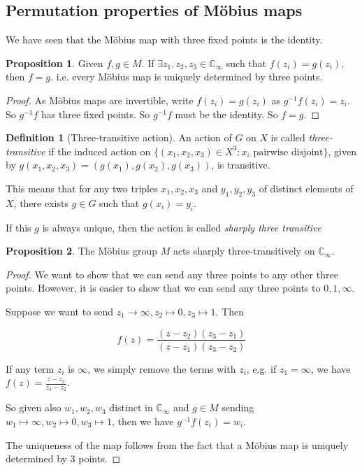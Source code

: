 \documentclass[a4paper]{article}
\theoremstyle{definition}
\newtheorem*{prop}{Proposition}
\newtheorem*{defi}{Definition}
\newcommand{\C}{\mathbb{C}}
\begin{document}
\subsection{Permutation properties of M\"obius maps}
We have seen that the M\"obius map with three fixed points is the identity.

\begin{prop}
  Given $f, g\in M$. If $\exists z_1, z_2, z_3\in \C_{\infty}$ such that $f(z_i) = g(z_i)$, then $f = g$. i.e. every M\"obius map is uniquely determined by three points. 
\end{prop}

\begin{proof}
  As M\"obius maps are invertible, write $f(z_i) = g(z_i)$ as $g^{-1}f(z_i) = z_i$. So $g^{-1}f$ has three fixed points. So $g^{-1}f$ must be the identity. So $f = g$.
\end{proof}

\begin{defi}[Three-transitive action]
  An action of $G$ on $X$ is called \emph{three-transitive} if the induced action on $\{(x_1, x_2, x_3)\in X^3: x_i\text{ pairwise disjoint}\}$, given by $g(x_1, x_2, x_3) = (g(x_1), g(x_2), g(x_3))$, is transitive.

This means that for any two triples $x_1, x_2, x_3$ and $y_1, y_2, y_3$ of distinct elements of $X$, there exists $g\in G$ such that $g(x_i) = y_i$.

If this $g$ is always unique, then the action is called \emph{sharply three transitive}
\end{defi}

\begin{prop}
  The M\"obius group $M$ acts sharply three-transitively on $\C_\infty$.
\end{prop}

\begin{proof}
  We want to show that we can send any three points to any other three points. However, it is easier to show that we can send any three points to $0, 1, \infty$. 

Suppose we want to send $z_1\to \infty, z_2\mapsto 0, z_3 \mapsto 1$. Then

\[
f(z) = \frac{(z - z_2)(z_3 - z_1)}{(z - z_1)(z_3 - z_2)}
\]

If any term $z_i$ is $\infty$, we simply remove the terms with $z_i$, e.g. if $z_1 = \infty$, we have $f(z) = \frac{z - z_2}{z_3 - z_2}$.

So given also $w_1, w_2, w_3$ distinct in $\C_\infty$ and $g\in M$ sending $w_1\mapsto \infty, w_2\mapsto 0, w_3\mapsto 1$, then we have $g^{-1}f(z_i) = w_i$.

The uniqueness of the map follows from the fact that a M\"obius map is uniquely determined by 3 points.
\end{proof}
\end{document}
